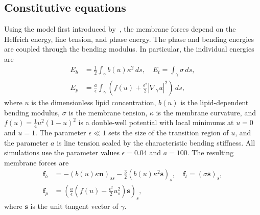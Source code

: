 \documentclass[twoside,twocolumn,9pt]{article}
\newcommand{\ff}{\mathbf{f}}
\newcommand{\nn}{\mathbf{n}}
\renewcommand{\ss}{\mathbf{s}}
\begin{document}
\subsection{Constitutive equations\label{subsec:const_eq}}
Using the model first introduced by~\citet{liu-mar-li-vee-low2017}, the
membrane forces depend on the Helfrich energy, line tension, and phase
energy. The phase and bending energies are coupled through the bending
modulus. In particular, the individual energies are
\begin{align}
  E_b &= \frac{1}{2}\int_{\gamma} b(u) \kappa^2 \, ds, \quad
  E_t = \int_{\gamma} \sigma \, ds, \\
  E_p &= \frac{a}{\epsilon}\int_{\gamma}\left(
  f(u) +\frac{\epsilon^2}{2}|\nabla_\gamma u|^2\right) \, ds,
  \label{eqn:PhaseEnergy}
\end{align}
where $u$ is the dimensionless lipid concentration, $b(u)$ is the
lipid-dependent bending modulus, $\sigma$ is the membrane tension,
$\kappa$ is the membrane curvature, and $f(u) = \frac{1}{4}u^2(1-u)^2$
is a double-well potential with local minimums at $u=0$ and $u=1$. The
parameter $\epsilon \ll 1$ sets the size of the transition region of
$u$, and the parameter $a$ is line tension scaled by the characteristic
bending stiffness. All simulations use the parameter values
$\epsilon=0.04$ and $a=100$. The resulting membrane forces are
\begin{align}
  \ff_b &= -(b(u)\kappa \nn)_{ss} -\frac{3}{2}
    \left(b(u) \kappa^2 \ss\right)_s,  \quad
  \ff_t = (\sigma \ss)_s, \\
  \ff_p &= \left(\frac{a}{\epsilon}\left(f(u) -
     \frac{\epsilon^2}{2} u_s^2\right) \ss \right)_s,
\end{align}
where $\ss$ is the unit tangent vector of $\gamma$.
\end{document}
